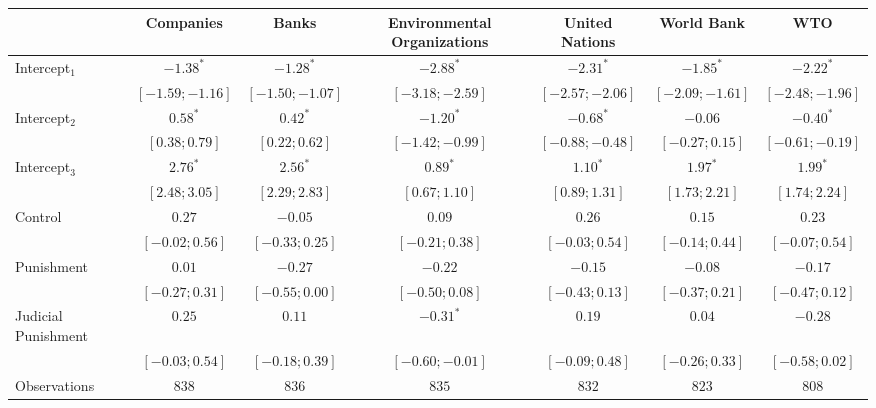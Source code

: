 \begin{table}[h]
\begin{center}
\begin{threeparttable}
\begin{tabular}{l c c c c c c}
\hline
 & Companies & Banks & Environmental Organizations & United Nations & World Bank & WTO \\
\hline
Intercept$_1$       & $-1.38^{*}$       & $-1.28^{*}$       & $-2.88^{*}$       & $-2.31^{*}$       & $-1.85^{*}$       & $-2.22^{*}$       \\
                    & $ [-1.59; -1.16]$ & $ [-1.50; -1.07]$ & $ [-3.18; -2.59]$ & $ [-2.57; -2.06]$ & $ [-2.09; -1.61]$ & $ [-2.48; -1.96]$ \\
Intercept$_2$       & $0.58^{*}$        & $0.42^{*}$        & $-1.20^{*}$       & $-0.68^{*}$       & $-0.06$           & $-0.40^{*}$       \\
                    & $ [ 0.38;  0.79]$ & $ [ 0.22;  0.62]$ & $ [-1.42; -0.99]$ & $ [-0.88; -0.48]$ & $ [-0.27;  0.15]$ & $ [-0.61; -0.19]$ \\
Intercept$_3$       & $2.76^{*}$        & $2.56^{*}$        & $0.89^{*}$        & $1.10^{*}$        & $1.97^{*}$        & $1.99^{*}$        \\
                    & $ [ 2.48;  3.05]$ & $ [ 2.29;  2.83]$ & $ [ 0.67;  1.10]$ & $ [ 0.89;  1.31]$ & $ [ 1.73;  2.21]$ & $ [ 1.74;  2.24]$ \\
Control             & $0.27$            & $-0.05$           & $0.09$            & $0.26$            & $0.15$            & $0.23$            \\
                    & $ [-0.02;  0.56]$ & $ [-0.33;  0.25]$ & $ [-0.21;  0.38]$ & $ [-0.03;  0.54]$ & $ [-0.14;  0.44]$ & $ [-0.07;  0.54]$ \\
Punishment          & $0.01$            & $-0.27$           & $-0.22$           & $-0.15$           & $-0.08$           & $-0.17$           \\
                    & $ [-0.27;  0.31]$ & $ [-0.55;  0.00]$ & $ [-0.50;  0.08]$ & $ [-0.43;  0.13]$ & $ [-0.37;  0.21]$ & $ [-0.47;  0.12]$ \\
Judicial Punishment & $0.25$            & $0.11$            & $-0.31^{*}$       & $0.19$            & $0.04$            & $-0.28$           \\
                    & $ [-0.03;  0.54]$ & $ [-0.18;  0.39]$ & $ [-0.60; -0.01]$ & $ [-0.09;  0.48]$ & $ [-0.26;  0.33]$ & $ [-0.58;  0.02]$ \\
\hline
Observations        & $838$             & $836$             & $835$             & $832$             & $823$             & $808$             \\

\end{tabular}
\end{threeparttable}
\end{center}
\end{table}
